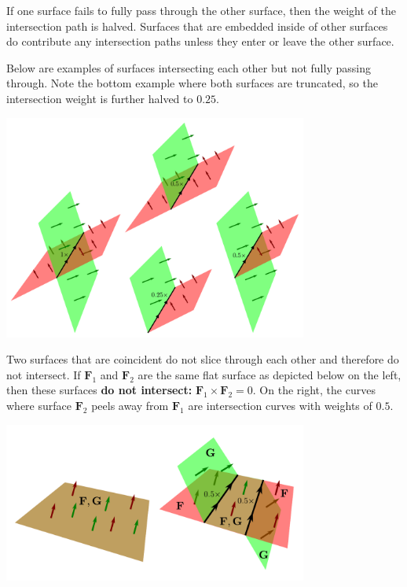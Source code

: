 If one surface fails to fully pass through the other surface, then the weight of the intersection path is halved. Surfaces that are embedded inside of other surfaces do contribute any intersection paths unless they enter or leave the other surface. 

Below are examples of surfaces intersecting each other but not fully passing through. Note the bottom example where both surfaces are truncated, so the intersection weight is further halved to \(0.25\).

\begin{center}
\includegraphics[width = 0.75\textwidth]{Intersections/Surface-surface_intersections/surface_surface_intersection_boundary_case}
\end{center}

Two surfaces that are coincident do not slice through each other and therefore do not intersect. If \(\mathbf{F}_1\) and \(\mathbf{F}_2\) are the same flat surface as depicted below on the left, then these surfaces {\bf do not intersect:} \(\mathbf{F}_1 \times \mathbf{F}_2 = 0\). On the right, the curves where surface \(\mathbf{F}_2\) peels away from \(\mathbf{F}_1\) are intersection curves with weights of \(0.5\).

\begin{center}
\includegraphics[width = 0.75\textwidth]{Intersections/Surface-surface_intersections/coincident_surfaces}
\end{center}

